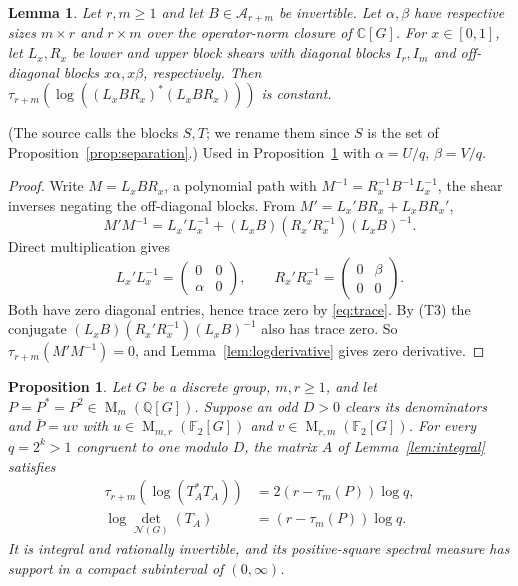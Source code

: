 \documentclass[11pt]{article}
\newtheorem{proposition}[theorem]{Proposition}
\newtheorem{lemma}[theorem]{Lemma}
\theoremstyle{remark}
\numberwithin{equation}{section}
\newcommand{\F}{\mathbb F}
\newcommand{\Q}{\mathbb Q}
\newcommand{\C}{\mathbb C}
\newcommand{\Mat}{\operatorname{M}}
\newcommand{\N}{\mathcal N}
\begin{document}
\begin{lemma}\label{lem:shears}
Let $r,m\ge1$ and let $B\in\mathcal A_{r+m}$ be invertible. Let $\alpha,\beta$ have respective sizes $m\times r$ and $r\times m$ over the operator-norm closure of $\C[G]$. For $x\in[0,1]$, let $L_x,R_x$ be lower and upper block shears with diagonal blocks $I_r,I_m$ and off-diagonal blocks $x\alpha,x\beta$, respectively. Then $\tau_{r+m}(\log((L_xBR_x)^*(L_xBR_x)))$ is constant.
\end{lemma}

(The source calls the blocks $S,T$; we rename them since $S$ is the set of Proposition~\ref{prop:separation}.) Used in Proposition~\ref{prop:criterion} with $\alpha=U/q$, $\beta=V/q$.

\begin{proof}
Write $M=L_xBR_x$, a polynomial path with $M^{-1}=R_x^{-1}B^{-1}L_x^{-1}$, the shear inverses negating the off-diagonal blocks. From $M'=L_x'BR_x+L_xBR_x'$,
\[
 M'M^{-1}=L_x'L_x^{-1}+(L_xB)(R_x'R_x^{-1})(L_xB)^{-1}.
\]
Direct multiplication gives
\[
 L_x'L_x^{-1}=\begin{pmatrix}0&0\\\alpha&0\end{pmatrix},\qquad
 R_x'R_x^{-1}=\begin{pmatrix}0&\beta\\0&0\end{pmatrix}.
\]
Both have zero diagonal entries, hence trace zero by \eqref{eq:trace}. By (T3) the conjugate $(L_xB)(R_x'R_x^{-1})(L_xB)^{-1}$ also has trace zero. So $\tau_{r+m}(M'M^{-1})=0$, and Lemma~\ref{lem:logderivative} gives zero derivative.
\end{proof}

\begin{proposition}\label{prop:criterion}
Let $G$ be a discrete group, $m,r\ge1$, and let $P=P^*=P^2\in\Mat_m(\Q[G])$. Suppose an odd $D>0$ clears its denominators and $\bar P=uv$ with $u\in\Mat_{m,r}(\F_2[G])$ and $v\in\Mat_{r,m}(\F_2[G])$. For every $q=2^k>1$ congruent to one modulo $D$, the matrix $A$ of Lemma~\ref{lem:integral} satisfies
\begin{align}
 \tau_{r+m}(\log(T_A^*T_A))
   &=2(r-\tau_m(P))\log q,\label{eq:criterion-trace}\\
 \log\det_{\N(G)}(T_A)&=(r-\tau_m(P))\log q.
 \label{eq:criterion-det}
\end{align}
It is integral and rationally invertible, and its positive-square spectral measure has support in a compact subinterval of $(0,\infty)$.
\end{proposition}
\end{document}
